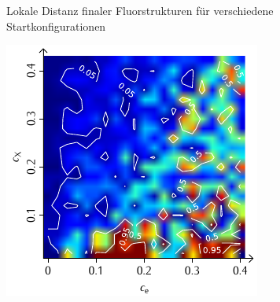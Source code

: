 \documentclass[a4paper, 10pt, twoside, openany]{book} %
\begin{document}
\begin{figure}
\begin{minipage}[t]{0.48\textwidth}
        \label{F_penalty_individual_D}
    \end{minipage}
    \caption[Lokale Distanz finaler Fluorstrukturen]{Lokale Distanz finaler Fluorstrukturen für verschiedene Startkonfigurationen}
    \label{F_D}
\end{figure}

\begin{figure}
    \begin{minipage}[t]{0.48\textwidth}
        \includegraphics[width=\textwidth]{Abbildungen/Phasendiagramme/Konturen/F_cluster_P.pdf}
        \label{F_cluster_P}
    \end{minipage}
    \hfill
    \begin{minipage}[t]{0.48\textwidth}

\end{minipage}
\end{figure}
\end{document}
